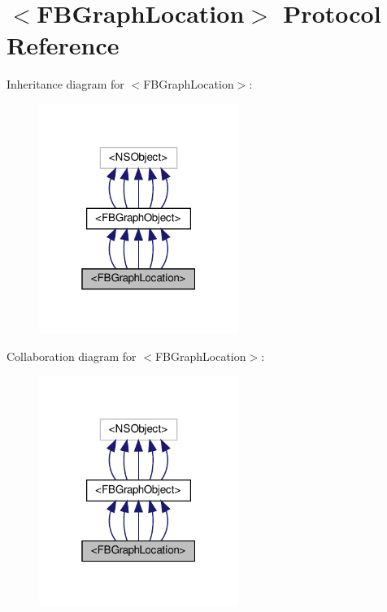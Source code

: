\hypertarget{protocolFBGraphLocation-p}{}\section{$<$F\+B\+Graph\+Location$>$ Protocol Reference}
\label{protocolFBGraphLocation-p}


Inheritance diagram for $<$F\+B\+Graph\+Location$>$\+:
\nopagebreak
\begin{figure}[H]
\begin{center}
\leavevmode
\includegraphics[width=184pt]{protocolFBGraphLocation-p__inherit__graph}
\end{center}
\end{figure}


Collaboration diagram for $<$F\+B\+Graph\+Location$>$\+:
\nopagebreak
\begin{figure}[H]
\begin{center}
\leavevmode
\includegraphics[width=184pt]{protocolFBGraphLocation-p__coll__graph}
\end{center}
\end{figure}
